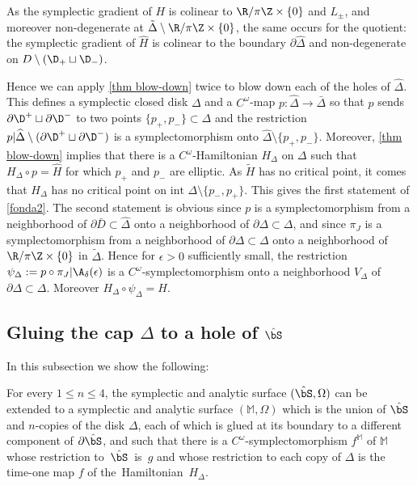 As the symplectic gradient of $H$ is colinear to $\R/\pi \Z\times \{0\}$ and $L_\pm$, and moreover non-degenerate at $\tilde \Delta\setminus \R/\pi \Z\times \{0\}$, the same occurs for the quotient: the symplectic gradient of $\widehat H$ is colinear to the boundary $\partial \widehat \Delta$ and non-degenerate on $D\setminus (\D_+\sqcup \D_-)$.

Hence we can apply \cref{thm blow-down} twice to blow down each of the holes of $\widehat \Delta$. This
defines a symplectic closed disk $\Delta$ and a $C^\omega$-map $p: \widehat \Delta\to \bar \Delta$ so that
$p$ sends $\partial \D^+\sqcup \partial \D^-$ to two points $\{p_+,p_-\} \subset \Delta$ and the restriction $p|\widehat \Delta \setminus (\partial \D^+\sqcup \partial \D^-)$ is a symplectomorphism onto $\widehat \Delta \setminus \{p_+,p_-\}$. Moreover, \cref{thm blow-down} implies that there is a $C^\omega$-Hamiltonian $H_\Delta$ on $\Delta$ such that $H_\Delta\circ p= \widehat H$ for which $p_+$ and $p_-$ are elliptic. As $\tilde H$ has no critical point, it comes that $H_\Delta$ has no critical point on $\text{int }\Delta \setminus \{p_-,p_+\}$. This gives the first statement of \cref{fonda2}. The second statement is obvious since $p$ is a symplectomorphism from a neighborhood of $\partial \bar D\subset \widehat \Delta$ onto a neighborhood of $\partial\Delta\subset \Delta$, and since $\pi_J$ is a symplectomorphism from a neighborhood of $\partial\Delta\subset \Delta$ onto a neighborhood of $\R/\pi \Z\times \{0\}$ in $\tilde \Delta$. Hence for $\epsilon>0$ sufficiently small, the restriction $\psi_\Delta:= p\circ \pi_J|\A_\delta(\epsilon)$ is a $C^\omega$-symplectomorphism onto a neighborhood $V_\Delta$ of $\partial \Delta\subset \Delta$. Moreover $H_\Delta\circ \psi_\Delta = H$.\enlargethispage{.5\baselineskip}%

\subsection{Gluing the cap $\Delta$ to a hole of $\hat \bS$}\label{S34}
In this subsection we show the following:

\begin{claim}\label{recap}
For every $1\le n\le 4$, the symplectic and analytic surface $(\hat \bS,\Omega)$ can be extended to a symplectic and analytic surface $(\mathbb M,\Omega)$ which is the union of $\hat \bS$ and $n$-copies of the disk $\Delta$, each of which is glued at its boundary to a different component of $\partial \hat\bS$, and such that there is a $C^\omega$-symplectomorphism $f^{\mathbb M}$ of $\mathbb M$ whose restriction to~$\hat \bS$~is~$g$ and
whose restriction to each copy of $\Delta$ is the time-one map $f$ of the~Hamiltonian~$H_\Delta$.
\end{claim}

